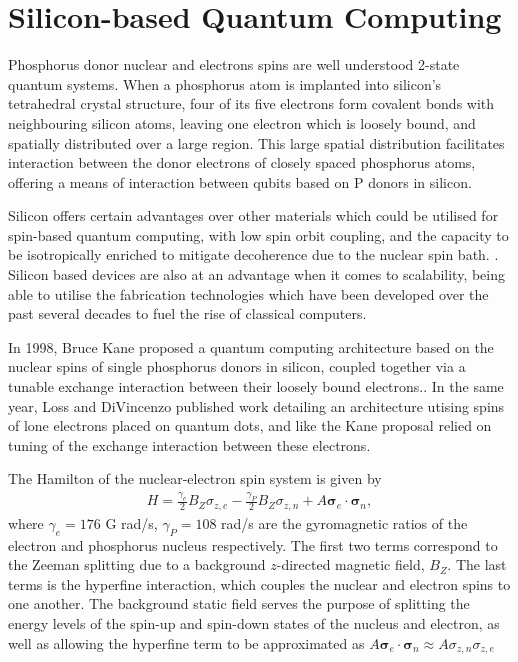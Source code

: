 \documentclass[../Thesis.tex]{subfiles}
\begin{document}
\section{Silicon-based Quantum Computing}
Phosphorus donor nuclear and electrons spins are well understood 2-state quantum systems. When a phosphorus atom is implanted into silicon's tetrahedral crystal structure, four of its five electrons form covalent bonds with neighbouring silicon atoms, leaving one electron which is loosely bound, and spatially distributed over a large region\cite{kittel_introduction_2005}. This large spatial distribution facilitates interaction between the donor electrons of closely spaced phosphorus atoms, offering a means of interaction between qubits based on P donors in silicon. 

Silicon offers certain advantages over other materials which could be utilised for spin-based quantum computing, with low spin orbit coupling, and the capacity to be isotropically enriched to mitigate decoherence due to the nuclear spin bath. \cite{ager_high-purity_2005}. Silicon based devices are also at an advantage when it comes to scalability, being able to utilise the fabrication technologies which have been developed over the past several decades to fuel the rise of classical computers. 

In 1998, Bruce Kane proposed a quantum computing architecture based on the nuclear spins of single phosphorus donors in silicon, coupled together via a tunable exchange interaction between their loosely bound electrons.\cite{kane_silicon-based_1998}. In the same year, Loss and DiVincenzo published work detailing an architecture utising spins of lone electrons placed on quantum dots, and like the Kane proposal relied on tuning of the exchange interaction between these electrons\cite{loss_quantum_1998}.


The Hamilton of the nuclear-electron spin system is given by
\begin{align}
    H = \frac{\gamma_e}{2}B_Z \sigma_{z,e} - \frac{\gamma_P}{2}B_Z\sigma_{z,n} + A\bm{\sigma}_e\cdot\bm{\sigma}_n,
\end{align}
where $\gamma_e = 176$ G rad/s, $\gamma_P = 108$ rad/s are the gyromagnetic ratios of the electron and phosphorus nucleus respectively. The first two terms correspond to the Zeeman splitting due to a background $z$-directed magnetic field, $B_Z$. The last terms is the hyperfine interaction, which couples the nuclear and electron spins to one another. The background static field serves the purpose of splitting the energy levels of the spin-up and spin-down states of the nucleus and electron, as well as allowing the hyperfine term to be approximated as $A\bm{\sigma}_e\cdot\bm{\sigma}_n\approx A\sigma_{z,n}\sigma_{z,e}$
\end{document}
